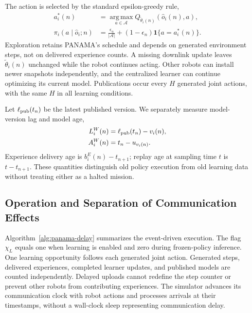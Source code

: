 \begin{panamaaddition}
The action is selected by the standard epsilon-greedy rule,
\begin{align}
 a_i^*(n)&=\operatorname*{arg\,max}_{a\in\mathcal{A}}
     Q_{\widetilde{\theta}_i(n)}(\widehat{o}_i(n),a),\\
 \pi_i(a\mid\widehat{o}_i;n)&=\frac{\epsilon_n}{|\mathcal{A}|}
       +(1-\epsilon_n)\mathbf{1}\{a=a_i^*(n)\}.
 \label{eq:panama-action}
\end{align}
Exploration retains PANAMA's schedule and depends on generated environment
steps, not on delivered experience counts. A missing downlink update leaves
$\widetilde{\theta}_i(n)$ unchanged while the robot continues acting.
Other robots can install newer snapshots independently, and the centralized
learner can continue optimizing its current model. Publications occur every
$H$ generated joint actions, with the same $H$ in all learning conditions.

Let $\ell_{\rm pub}(t_n)$ be the latest published version. We separately
measure model-version lag and model age,
\begin{align}
 L_i^W(n)&=\ell_{\rm pub}(t_n)-v_i(n),\\
 A_i^W(n)&=t_n-u_{v_i(n)}.
 \label{eq:panama-model-age}
\end{align}
Experience delivery age is $b_i^E(n)-t_{n+1}$; replay age at sampling time
$t$ is $t-t_{n+1}$. These quantities distinguish old policy execution from
old learning data without treating either as a halted mission.

\subsection{Operation and Separation of Communication Effects}
Algorithm~\ref{alg:panama-delay} summarizes the event-driven execution.
The flag $\chi_L$ equals one when learning is enabled and zero during
frozen-policy inference.
One learning opportunity follows each generated joint action. Generated
steps, delivered experiences, completed learner updates, and published models
are counted independently. Delayed uploads cannot redefine the step counter
or prevent other robots from contributing experiences. The simulator advances
its communication clock with robot actions and processes arrivals at their
timestamps, without a wall-clock sleep representing communication delay.


\end{panamaaddition}
